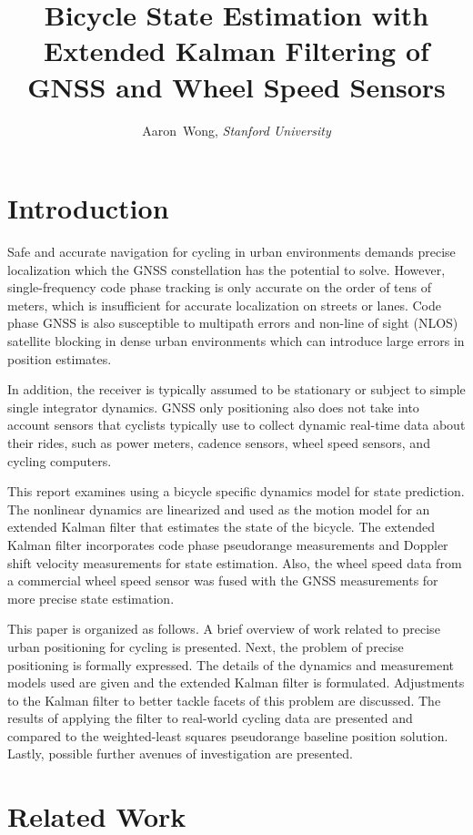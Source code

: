 \documentclass[letterpaper,times]{IONconf}
\title{Bicycle State Estimation with Extended Kalman Filtering of GNSS and Wheel Speed Sensors}
\author{
    Aaron~Wong, \textit{Stanford University}%
}
\begin{document}
\maketitle

\section{Introduction}

Safe and accurate navigation for cycling in urban environments demands precise localization which the GNSS constellation has the potential to solve. However, single-frequency code phase tracking is only accurate on the order of tens of meters, which is insufficient for accurate localization on streets or lanes.  Code phase GNSS is also susceptible to multipath errors and non-line of sight (NLOS) satellite blocking in dense urban environments which can introduce large errors in position estimates. 

In addition, the receiver is typically assumed to be stationary or subject to simple single integrator dynamics. GNSS only positioning also does not take into account sensors that cyclists typically use to collect dynamic real-time data about their rides, such as power meters, cadence sensors, wheel speed sensors, and cycling computers. 

This report examines using a bicycle specific dynamics model for state prediction. The  nonlinear dynamics are linearized and used as the motion model for an extended Kalman filter that estimates the state of the bicycle. The extended Kalman filter incorporates code phase pseudorange measurements and Doppler shift velocity measurements for state estimation. Also, the wheel speed data from a commercial wheel speed sensor was fused with the GNSS measurements for more precise state estimation. 

This paper is organized as follows. A brief overview of work related to precise urban positioning for cycling is presented. Next, the problem of precise positioning is formally expressed. The details of the dynamics and measurement models used are given and the extended Kalman filter is formulated. Adjustments to the Kalman filter to better tackle facets of this problem are discussed. The results of applying the filter to real-world cycling data are presented and compared to the weighted-least squares pseudorange baseline position solution. Lastly, possible further avenues of investigation are presented.

\section{Related Work}
\end{document}
